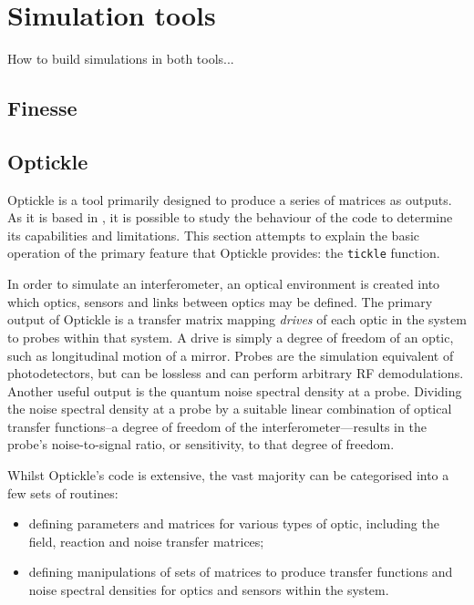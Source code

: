 \chapter{\label{a:simulation-tools}Simulation tools}
How to build simulations in both tools...


\section{Finesse}

\section{Optickle}
Optickle is a tool primarily designed to produce a series of matrices as outputs. As it is based in \MATLAB, it is possible to study the behaviour of the code to determine its capabilities and limitations. This section attempts to explain the basic operation of the primary feature that Optickle provides: the \lstinline{tickle} function.

In order to simulate an interferometer, an optical environment is created into which optics, sensors and links between optics may be defined. The primary output of Optickle is a transfer matrix mapping \emph{drives} of each optic in the system to probes within that system. A drive is simply a degree of freedom of an optic, such as longitudinal motion of a mirror. Probes are the simulation equivalent of photodetectors, but can be lossless and can perform arbitrary RF demodulations. Another useful output is the quantum noise spectral density at a probe. Dividing the noise spectral density at a probe by a suitable linear combination of optical transfer functions--a degree of freedom of the interferometer---results in the probe's noise-to-signal ratio, or sensitivity, to that degree of freedom.

Whilst Optickle's code is extensive, the vast majority can be categorised into a few sets of routines:

\begin{itemize}
  \item defining parameters and matrices for various types of optic, including the field, reaction and noise transfer matrices;
  \item defining manipulations of sets of matrices to produce transfer functions and noise spectral densities for optics and sensors within the system.
\end{itemize}


